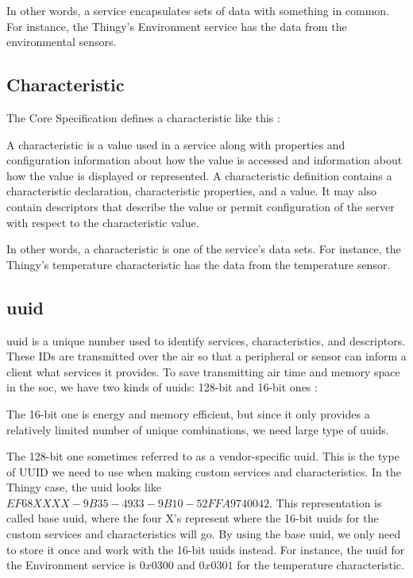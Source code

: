 In other words, a service encapsulates sets of data with something in common. For instance, the Thingy's Environment service has the data from the environmental sensors.
\subsection{Characteristic}
The \bt Core Specification defines a characteristic like this \cite{bluetoothspecs}:
\begin{displayquote}
A characteristic is a value used in a service along with properties and configuration information about how the value is accessed and information about how the value is displayed or represented. A characteristic definition contains a characteristic declaration, characteristic properties, and a value. It may also contain descriptors that describe the value or permit configuration of the server with respect to the characteristic value.
\end{displayquote}

In other words, a characteristic is one of the service's data sets. For instance, the Thingy's temperature characteristic has the data from the temperature sensor.

\subsection{\gls{uuid}}
\gls{uuid} is a unique number used to identify services, characteristics, and descriptors. These IDs are transmitted over the air so that a peripheral or sensor can inform a client what services it provides. To save transmitting air time and memory space in the \gls{soc}, we have two kinds of \gls{uuid}s: 128-bit and 16-bit ones \cite{uuid}:

The 16-bit one is energy and memory efficient, but since it only provides a relatively limited number of unique combinations, we need large type of \gls{uuid}s.

The 128-bit one sometimes referred to as a vendor-specific \gls{uuid}. This is the type of UUID we need to use when making custom services and characteristics. In the Thingy case, the \gls{uuid} looks like $EF68XXXX-9B35-4933-9B10-52FFA9740042$. This representation is called base \gls{uuid}, where the four X's represent where the 16-bit \gls{uuid}s for the custom services and characteristics will go. By using the base \gls{uuid}, we only need to store it once and work with the 16-bit \gls{uuid}s instead. For instance, the \gls{uuid} for the Environment service is $0x0300$ and $0x0301$ for the temperature characteristic.

